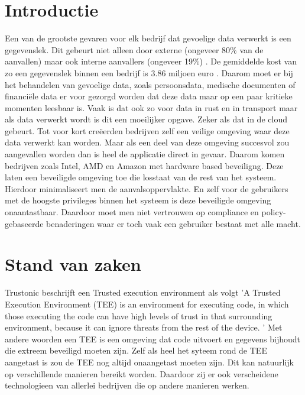 
\section{Introductie} %
\label{sec:introductie}

Een van de grootste gevaren voor elk bedrijf dat gevoelige data verwerkt is een gegevenslek. Dit gebeurt niet alleen door externe (ongeveer 80\% van de aanvallen) maar ook interne aanvallers (ongeveer 19\%) \autocite{Widup2021}.
De gemiddelde kost van zo een gegevenslek binnen een bedrijf is 3.86 miljoen euro  \autocite{2020}. 
Daarom moet er bij het behandelen van gevoelige data, zoals persoonsdata, medische documenten of financiële data er voor gezorgd worden dat deze data maar op een paar kritieke momenten leesbaar is. Vaak is dat ook zo voor data in rust en in transport maar als data verwerkt wordt is dit een moeilijker opgave. Zeker als dat in de cloud gebeurt. Tot voor kort creëerden bedrijven zelf een veilige omgeving waar deze data verwerkt kan worden. Maar als een deel van deze omgeving succesvol zou aangevallen worden dan is heel de applicatie direct in gevaar. Daarom komen bedrijven zoals Intel, AMD en Amazon met hardware based beveiligng. Deze laten een beveiligde omgeving toe die losstaat van de rest van het systeem. Hierdoor minimaliseert men de aanvalsoppervlakte. En zelf voor de gebruikers met de hoogste privileges binnen het systeem is deze beveiligde omgeving onaantastbaar. Daardoor moet men niet vertrouwen op compliance en policy-gebaseerde benaderingen waar er toch vaak een gebruiker bestaat met alle macht. \autocite{DanielNewman2021}




\section{Stand van zaken}
\label{sec:state-of-the-art}
Trustonic beschrijft een Trusted execution environment als volgt 'A Trusted Execution Environment (TEE) is an environment for executing code, in which those executing the code can have high levels of trust in that surrounding environment, because it can ignore threats from the rest of the device.  \autocite{Felton2019}' Met andere woorden een TEE is een omgeving dat code uitvoert en gegevens bijhoudt die extreem beveiligd moeten zijn. Zelf als heel het syteem rond de TEE aangetast is zou de TEE nog altijd onaangetast moeten zijn. Dit kan natuurlijk op verschillende manieren bereikt worden. Daardoor zij er ook verscheidene technologieen van allerlei bedrijven die op andere manieren werken.

